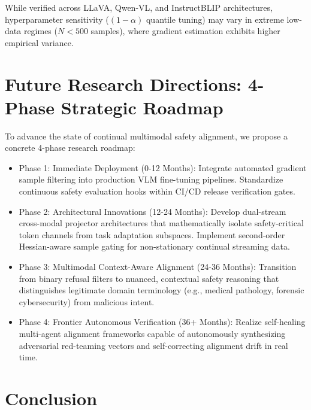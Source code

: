 \documentclass[10pt,journal,compsoc,twocolumn]{IEEEtran}
\begin{document}
\begin{table}[t]
\begin{table}[t]
While verified across LLaVA, Qwen-VL, and InstructBLIP architectures, hyperparameter sensitivity ($(1-\alpha)$ quantile tuning) may vary in extreme low-data regimes ($N < 500$ samples), where gradient estimation exhibits higher empirical variance.




\section{Future Research Directions: 4-Phase Strategic Roadmap}


To advance the state of continual multimodal safety alignment, we propose a concrete 4-phase research roadmap:
\begin{itemize}
  \item Phase 1: Immediate Deployment (0-12 Months): Integrate automated gradient sample filtering into production VLM fine-tuning pipelines. Standardize continuous safety evaluation hooks within CI/CD release verification gates.
  \item Phase 2: Architectural Innovations (12-24 Months): Develop dual-stream cross-modal projector architectures that mathematically isolate safety-critical token channels from task adaptation subspaces. Implement second-order Hessian-aware sample gating for non-stationary continual streaming data.
  \item Phase 3: Multimodal Context-Aware Alignment (24-36 Months): Transition from binary refusal filters to nuanced, contextual safety reasoning that distinguishes legitimate domain terminology (e.g., medical pathology, forensic cybersecurity) from malicious intent.
  \item Phase 4: Frontier Autonomous Verification (36+ Months): Realize self-healing multi-agent alignment frameworks capable of autonomously synthesizing adversarial red-teaming vectors and self-correcting alignment drift in real time.
\end{itemize}




\section{Conclusion}



\end{table}
\end{table}
\end{document}
